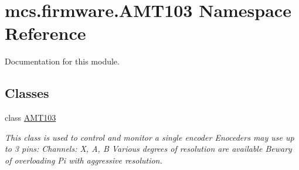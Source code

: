 \hypertarget{namespacemcs_1_1firmware_1_1AMT103}{}\section{mcs.\+firmware.\+A\+M\+T103 Namespace Reference}
\label{namespacemcs_1_1firmware_1_1AMT103}


Documentation for this module.  


\subsection*{Classes}
\begin{DoxyCompactItemize}
\item 
class \hyperlink{classmcs_1_1firmware_1_1AMT103_1_1AMT103}{A\+M\+T103}
\begin{DoxyCompactList}\small\item\em This class is used to control and monitor a single encoder Enoceders may use up to 3 pins\+: Channels\+: X, A, B Various degrees of resolution are available Bewary of overloading Pi with aggressive resolution. \end{DoxyCompactList}\end{DoxyCompactItemize}

